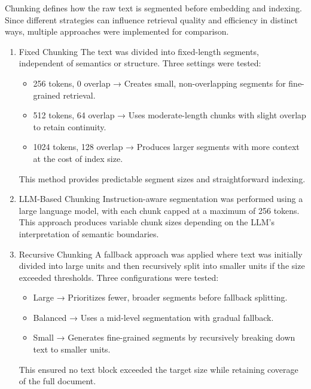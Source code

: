 Chunking defines how the raw text is segmented before embedding and indexing. Since different strategies can influence retrieval quality and efficiency in distinct ways, multiple approaches were implemented for comparison.
\begin{enumerate}
	\item Fixed Chunking
	The text was divided into fixed-length segments, independent of semantics or structure. Three settings were tested:
	\begin{itemize}
		\item 256 tokens, 0 overlap → Creates small, non-overlapping segments for fine-grained retrieval.
		
		\item 512 tokens, 64 overlap → Uses moderate-length chunks with slight overlap to retain continuity.
		
		\item 1024 tokens, 128 overlap → Produces larger segments with more context at the cost of index size.
	\end{itemize}
	
	This method provides predictable segment sizes and straightforward indexing.
	
	\item LLM-Based Chunking
	Instruction-aware segmentation was performed using a large language model, with each chunk capped at a maximum of 256 tokens. This approach produces variable chunk sizes depending on the LLM’s interpretation of semantic boundaries.
	
	\item Recursive Chunking
	A fallback approach was applied where text was initially divided into large units and then recursively split into smaller units if the size exceeded thresholds. Three configurations were tested:
	
	\begin{itemize}
		\item Large → Prioritizes fewer, broader segments before fallback splitting.
		
		\item Balanced → Uses a mid-level segmentation with gradual fallback.
		
		\item Small → Generates fine-grained segments by recursively breaking down text to smaller units.
	\end{itemize}
	This ensured no text block exceeded the target size while retaining coverage of the full document.
	

\end{enumerate}
